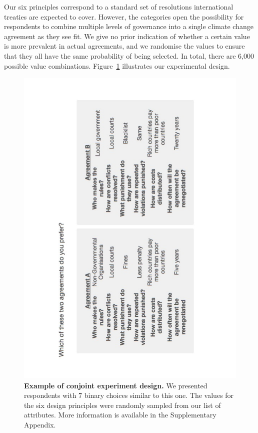 \documentclass[a4paper,12pt]{article}
\begin{document}
Our six principles correspond to a standard set of resolutions international treaties are expected to cover. However, the categories open the possibility for respondents to combine multiple levels of governance into a single climate change agreement as they see fit. We give no prior indication of whether a certain value is more prevalent in actual agreements, and we randomise the values to ensure that they all have the same probability of being selected. In total, there are 6,000 possible value combinations. Figure~\ref{fig:conjoint} illustrates our experimental design.\\

\begin{figure}[H]
	\centering
	\includegraphics[width=12cm,angle=270,origin=c]{conjoint.pdf}
	\caption{\textbf{Example of conjoint experiment design.} We presented respondents with 7 binary choices similar to this one. The values for the six design principles were randomly sampled from our list of attributes. More information is available in the Supplementary Appendix.}
	\label{fig:conjoint}
\end{figure}
\end{document}
